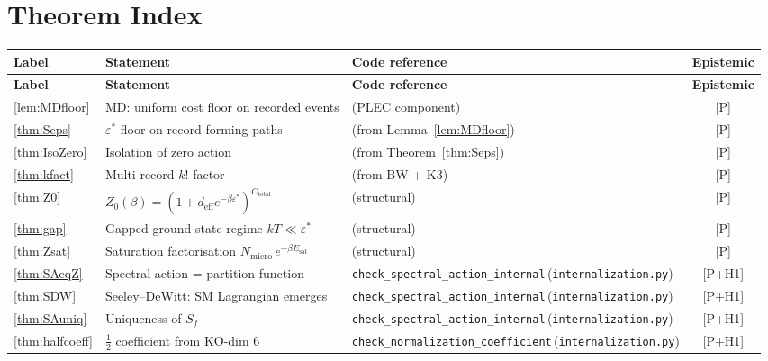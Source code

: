 \documentclass[11pt,a4paper]{article}
\theoremstyle{definition}
\newcommand{\epsstar}{\varepsilon^{\ast}}
\newcommand{\Ctot}{C_{\mathrm{total}}}
\newcommand{\deff}{d_{\mathrm{eff}}}
\newcommand{\coderef}[2]{\texttt{#1}\,(\texttt{#2})}
\begin{document}
\appendix

\section{Theorem Index}\label{app:index}

\begin{center}\small
\renewcommand{\arraystretch}{1.2}
\begin{longtable}{@{}lp{6.8cm}lc@{}}
\toprule
\textbf{Label} & \textbf{Statement} & \textbf{Code reference} & \textbf{Epistemic}\\
\midrule
\endfirsthead
\toprule
\textbf{Label} & \textbf{Statement} & \textbf{Code reference} & \textbf{Epistemic}\\
\midrule
\endhead
\ref{lem:MDfloor}  & MD: uniform cost floor on recorded events       & (PLEC component)                              & [P]\\
\ref{thm:Seps}     & $\epsstar$-floor on record-forming paths         & (from Lemma~\ref{lem:MDfloor})                 & [P]\\
\ref{thm:IsoZero}  & Isolation of zero action                        & (from Theorem~\ref{thm:Seps})                  & [P]\\
\ref{thm:kfact}    & Multi-record $k!$ factor                        & (from BW + K3)                                 & [P]\\
\ref{thm:Z0}       & $Z_0(\beta)=(1+\deff e^{-\beta\epsstar})^{\Ctot}$ & (structural)                                   & [P]\\
\ref{thm:gap}      & Gapped-ground-state regime $kT\ll\epsstar$      & (structural)                                   & [P]\\
\ref{thm:Zsat}     & Saturation factorisation $N_{\mathrm{micro}}\,e^{-\beta E_{\mathrm{sat}}}$ & (structural) & [P]\\
\ref{thm:SAeqZ}    & Spectral action = partition function            & \coderef{check\_spectral\_action\_internal}{internalization.py} & [P+H1]\\
\ref{thm:SDW}      & Seeley--DeWitt: SM Lagrangian emerges           & \coderef{check\_spectral\_action\_internal}{internalization.py} & [P+H1]\\
\ref{thm:SAuniq}   & Uniqueness of $S_f$                             & \coderef{check\_spectral\_action\_internal}{internalization.py} & [P+H1]\\
\ref{thm:halfcoeff}& $\tfrac12$ coefficient from KO-dim 6            & \coderef{check\_normalization\_coefficient}{internalization.py}  & [P+H1]\\

\end{longtable}
\end{center}
\end{document}
